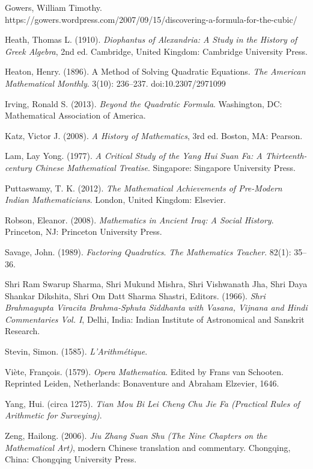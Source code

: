 \begin{thebibliography}{99}
   Gowers, William Timothy.
    https://gowers.wordpress.com/2007/09/15/discovering-a-formula-for-the-cubic/

   Heath, Thomas L. (1910). \emph{Diophantus of Alexandria:
    A Study in the History of Greek Algebra}, 2nd ed. Cambridge, United
    Kingdom: Cambridge University Press.

   Heaton, Henry. (1896). A Method of Solving Quadratic
    Equations.  \emph{The American Mathematical Monthly}. 3(10): 236--237.
    doi:10.2307/2971099

   Irving, Ronald S. (2013). \emph{Beyond the Quadratic
    Formula}. Washington, DC: Mathematical Association of America.

   Katz, Victor J. (2008). \emph{A History of Mathematics},
    3rd ed. Boston, MA: Pearson.

   Lam, Lay Yong. (1977). \emph{A Critical Study of the Yang
    Hui Suan Fa: A Thirteenth-century Chinese Mathematical Treatise}.
    Singapore: Singapore University Press.

   Puttaswamy, T. K. (2012). \emph{The Mathematical
    Achievements of Pre-Modern Indian Mathematicians}. London, United
    Kingdom: Elsevier.

   Robson, Eleanor. (2008). \emph{Mathematics in Ancient
    Iraq: A Social History}. Princeton, NJ: Princeton University Press.

   Savage, John. (1989). \emph{Factoring Quadratics}. 
    \emph{The Mathematics Teacher}. 82(1): 35--36.

   Shri Ram Swarup Sharma, Shri Mukund Mishra, Shri
    Vishwanath Jha, Shri Daya Shankar Dikshita, Shri Om Datt Sharma
    Shastri, Editors. (1966). \emph{Shri Brahmagupta Viracita Brahma-Sphuta
    Siddhanta with Vasana, Vijnana and Hindi Commentaries Vol. I}, Delhi,
    India: Indian Institute of Astronomical and Sanskrit Research.

   Stevin, Simon. (1585). \emph{L'Arithm\'etique}.

   Vi\`ete, Fran\c{c}ois. (1579). \emph{Opera Mathematica}.
    Edited by Frans van Schooten. Reprinted Leiden, Netherlands:
    Bonaventure and Abraham Elzevier, 1646.

   Yang, Hui. (circa 1275). \emph{Tian Mou Bi Lei Cheng
    Chu Jie Fa (Practical Rules of Arithmetic for Surveying)}.

   Zeng, Hailong. (2006). \emph{Jiu Zhang Suan Shu (The Nine
    Chapters on the Mathematical Art)}, modern Chinese translation and
    commentary. Chongqing, China: Chongqing University Press.

\end{thebibliography}





